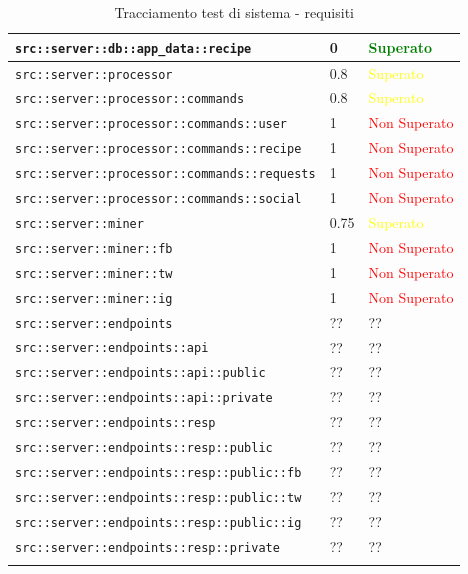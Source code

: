 \begin{center}
\begin{longtable}{| p{8.5cm} | p{3.5cm} | p{3cm} |}
					\hline
					\texttt{src::server::db::app\_data::recipe} & 0 & \textcolor{green}{Superato}\\
					\hline
					\texttt{src::server::processor} & 0.8 & \textcolor{yellow}{Superato}\\
					\hline
					\texttt{src::server::processor::commands} & 0.8 & \textcolor{yellow}{Superato}\\
					\hline
					\texttt{src::server::processor::commands::user} & 1 & \textcolor{red}{Non Superato}\\
					\hline
					\texttt{src::server::processor::commands::recipe} & 1 & \textcolor{red}{Non Superato}\\
					\hline
					\texttt{src::server::processor::commands::requests} & 1 & \textcolor{red}{Non Superato}\\
					\hline
					\texttt{src::server::processor::commands::social} & 1 & \textcolor{red}{Non Superato}\\
					\hline
					\texttt{src::server::miner} & 0.75 & \textcolor{yellow}{Superato}\\
					\hline
					\texttt{src::server::miner::fb} & 1 & \textcolor{red}{Non Superato}\\
					\hline
					\texttt{src::server::miner::tw} & 1 & \textcolor{red}{Non Superato}\\
					\hline
					\texttt{src::server::miner::ig} & 1 & \textcolor{red}{Non Superato}\\
					\hline
					\texttt{src::server::endpoints} & ?? & ??\\
					\hline
					\texttt{src::server::endpoints::api} & ?? & ??\\
					\hline
					\texttt{src::server::endpoints::api::public} & ?? & ??\\
					\hline
					\texttt{src::server::endpoints::api::private} & ?? & ??\\
					\hline
					\texttt{src::server::endpoints::resp} & ?? & ??\\
					\hline
					\texttt{src::server::endpoints::resp::public} & ?? & ??\\
					\hline
					\texttt{src::server::endpoints::resp::public::fb} & ?? & ??\\
					\hline
					\texttt{src::server::endpoints::resp::public::tw} & ?? & ??\\
					\hline
					\texttt{src::server::endpoints::resp::public::ig} & ?? & ??\\
					\hline
					\texttt{src::server::endpoints::resp::private} & ?? & ??\\
					\hline
					\caption{Tracciamento test di sistema - requisiti}
				\end{longtable}
				\egroup
			\end{center}		
			
